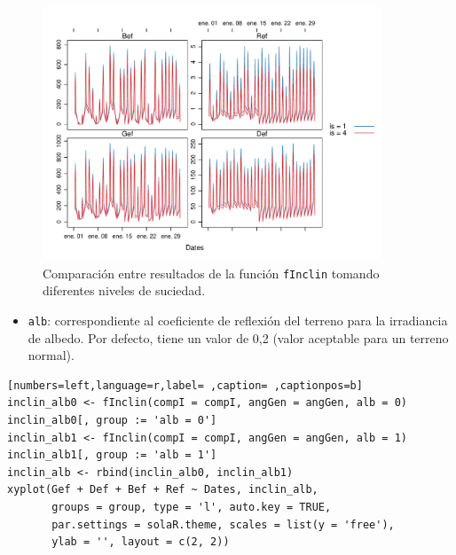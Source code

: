 \begin{itemize}
\begin{figure}[!htb]
\centering
\includegraphics[width=0.9\textwidth]{figuras/codigo-finclinis.pdf}
\caption{Comparación entre resultados de la función \texttt{fInclin} tomando diferentes niveles de suciedad.}
\end{figure}
\begin{itemize}
\item \texttt{alb}: correspondiente al coeficiente de reflexión del terreno para la irradiancia de albedo. Por defecto, tiene un valor de 0,2 (valor aceptable para un terreno normal).
\end{itemize}
\begin{lstlisting}[numbers=left,language=r,label= ,caption= ,captionpos=b]
inclin_alb0 <- fInclin(compI = compI, angGen = angGen, alb = 0)
inclin_alb0[, group := 'alb = 0']
inclin_alb1 <- fInclin(compI = compI, angGen = angGen, alb = 1)
inclin_alb1[, group := 'alb = 1']
inclin_alb <- rbind(inclin_alb0, inclin_alb1)
xyplot(Gef + Def + Bef + Ref ~ Dates, inclin_alb,
       groups = group, type = 'l', auto.key = TRUE,
       par.settings = solaR.theme, scales = list(y = 'free'),
       ylab = '', layout = c(2, 2))
\end{lstlisting}


\end{itemize}
